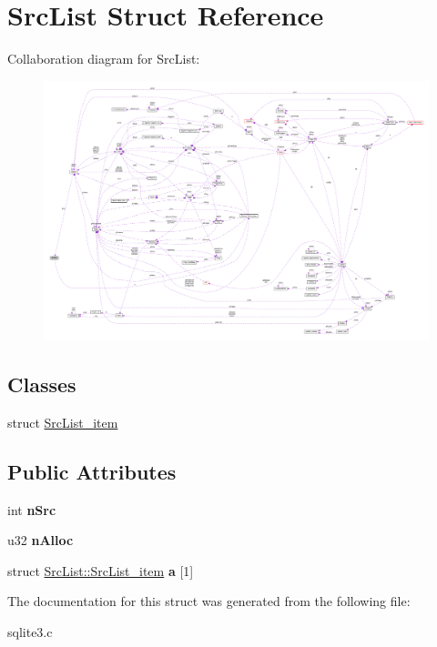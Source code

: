 \hypertarget{structSrcList}{}\section{Src\+List Struct Reference}
\label{structSrcList}


Collaboration diagram for Src\+List\+:\nopagebreak
\begin{figure}[H]
\begin{center}
\leavevmode
\includegraphics[width=350pt]{structSrcList__coll__graph}
\end{center}
\end{figure}
\subsection*{Classes}
\begin{DoxyCompactItemize}
\item 
struct \hyperlink{structSrcList_1_1SrcList__item}{Src\+List\+\_\+item}
\end{DoxyCompactItemize}
\subsection*{Public Attributes}
\begin{DoxyCompactItemize}
\item 
int {\bfseries n\+Src}\hypertarget{structSrcList_a8ecf9cced910877d93210ace66365ec8}{}\label{structSrcList_a8ecf9cced910877d93210ace66365ec8}

\item 
u32 {\bfseries n\+Alloc}\hypertarget{structSrcList_ab9c572bef9144ab245f7f46bc5b82a61}{}\label{structSrcList_ab9c572bef9144ab245f7f46bc5b82a61}

\item 
struct \hyperlink{structSrcList_1_1SrcList__item}{Src\+List\+::\+Src\+List\+\_\+item} {\bfseries a} \mbox{[}1\mbox{]}\hypertarget{structSrcList_acd181938f7144b40022b28072247aa3d}{}\label{structSrcList_acd181938f7144b40022b28072247aa3d}

\end{DoxyCompactItemize}


The documentation for this struct was generated from the following file\+:\begin{DoxyCompactItemize}
\item 
sqlite3.\+c\end{DoxyCompactItemize}
